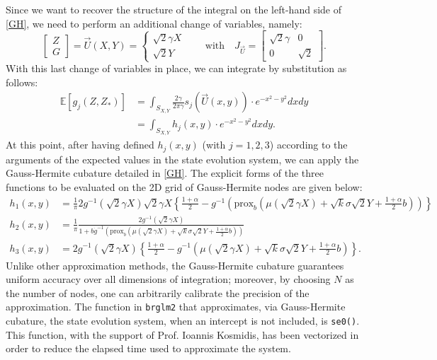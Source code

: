 \documentclass{article}
\begin{document}
Since we want to recover the structure of the integral on the left-hand side of \eqref{GH}, we need to perform an additional change of variables, namely:
\begin{equation*}
\begin{bmatrix}
Z\\
G
\end{bmatrix}=\vec{U}(X,Y)=\begin{cases}
\sqrt{2}\gamma X\\
\sqrt{2}Y
\end{cases}\qquad \text{with}\quad J_{\vec{U}}=\begin{bmatrix}
\sqrt{2}\gamma & 0 \\
0 & \sqrt{2}
\end{bmatrix}.
\end{equation*}
With this last change of variables in place, we can integrate by substitution as follows:
\begin{align*}
\mathbb{E}[g_j(Z,Z_*)]&=\int_{S_{X,Y}}\frac{2\gamma}{2\pi\gamma}s_j(\vec{U}(x,y))\cdot e^{-x^2-y^2}dxdy\\
&=\int_{S_{X,Y}}h_j(x,y)\cdot e^{-x^2-y^2}dxdy.
\end{align*}
At this point, after having defined $h_j(x,y)$ (with $j=1,2,3$) according to the arguments of the expected values in the state evolution system, we can apply the Gauss-Hermite cubature detailed in \eqref{GH}. The explicit forms of the three functions to be evaluated on the 2D grid of Gauss-Hermite nodes are given below:
\begin{align*}
h_1(x,y)&=\frac{1}{\pi}2g^{-1}(\sqrt{2}\gamma X)\sqrt{2}\gamma X\left\{\frac{1+\alpha}{2}-g^{-1}\left(\text{prox}_{b}\left( \mu(\sqrt{2}\gamma X)+\sqrt{k}\sigma \sqrt{2}Y+\frac{1+\alpha}{2}b\right)\right) \right\}\\[10pt]
h_2(x,y)&=\frac{1}{\pi}\frac{2g^{-1}(\sqrt{2}\gamma X)}{1+b\dot{g}^{-1}(\text{prox}_b(\mu (\sqrt{2}\gamma X)+\sqrt{k}\sigma \sqrt{2}Y+\frac{1+\alpha}{2}b))}\\[10pt]
h_3(x,y)&=2g^{-1}(\sqrt{2}\gamma X)\left\{\frac{1+\alpha}{2}-g^{-1}\left(\mu (\sqrt{2}\gamma X)+\sqrt{k}\sigma \sqrt{2}Y+\frac{1+\alpha}{2}b\right)\right\}.
\end{align*}
Unlike other approximation methods, the Gauss-Hermite cubature guarantees uniform accuracy over all dimensions of integration; moreover, by choosing $N$ as the number of nodes, one can arbitrarily calibrate the precision of the approximation. The function in \texttt{brglm2} that approximates, via Gauss-Hermite cubature, the state evolution system, when an intercept is not included, is \texttt{se0()}. This function, with the support of Prof. Ioannis Kosmidis, has been vectorized in order to reduce the elapsed time used to approximate the system.  
\end{document}
